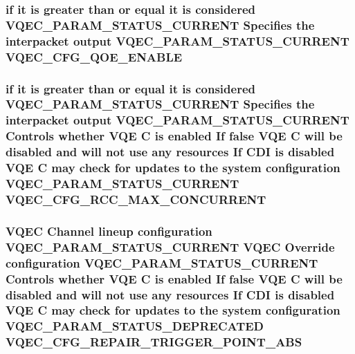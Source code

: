 \subsubsection{\setlength{\rightskip}{0pt plus 5cm}if it is greater than or equal it is considered VQEC\_\-PARAM\_\-STATUS\_\-CURRENT Specifies the interpacket output VQEC\_\-PARAM\_\-STATUS\_\-CURRENT \bf{VQEC\_\-CFG\_\-QOE\_\-ENABLE}}\label{vqec__cfg__settings_8h_85d5d1ebb9a2bef85f344dd7e7ddcd0e}


\subsubsection{\setlength{\rightskip}{0pt plus 5cm}if it is greater than or equal it is considered VQEC\_\-PARAM\_\-STATUS\_\-CURRENT Specifies the interpacket output VQEC\_\-PARAM\_\-STATUS\_\-CURRENT Controls whether VQE \bf{C} is enabled If false VQE \bf{C} will be disabled and will not use any resources If CDI is disabled VQE \bf{C} may check for updates \bf{to} the system configuration VQEC\_\-PARAM\_\-STATUS\_\-CURRENT \bf{VQEC\_\-CFG\_\-RCC\_\-MAX\_\-CONCURRENT}}\label{vqec__cfg__settings_8h_961c51b8d9dc1e912f923837d14e43dd}


\subsubsection{\setlength{\rightskip}{0pt plus 5cm}VQEC Channel lineup configuration VQEC\_\-PARAM\_\-STATUS\_\-CURRENT VQEC Override configuration VQEC\_\-PARAM\_\-STATUS\_\-CURRENT Controls whether VQE \bf{C} is enabled If false VQE \bf{C} will be disabled and will not use any resources If CDI is disabled VQE \bf{C} may check for updates \bf{to} the system configuration VQEC\_\-PARAM\_\-STATUS\_\-DEPRECATED \bf{VQEC\_\-CFG\_\-REPAIR\_\-TRIGGER\_\-POINT\_\-ABS}}\label{vqec__cfg__settings_8h_0ef06bb2b7cd85d977b66c2ed8efa728}


